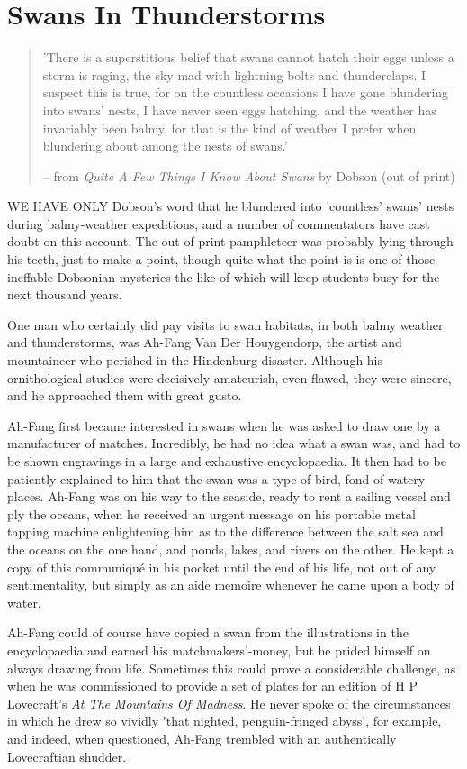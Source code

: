 \chapter{Swans In Thunderstorms}

\begin{quotation}
'There is a superstitious belief that swans cannot hatch their eggs unless a storm is raging, the sky mad with lightning bolts and thunderclaps. I suspect this is true, for on the countless occasions I have gone blundering into swans' nests, I have never seen eggs hatching, and the weather has invariably been balmy, for that is the kind of weather I prefer when blundering about among the nests of swans.' 

-- from \emph{Quite A Few Things I Know About Swans} by Dobson (out of print)
\end{quotation}

WE HAVE ONLY Dobson's word that he blundered into 'countless' swans' nests during balmy-weather expeditions, and a number of commentators have cast doubt on this account. The out of print pamphleteer was probably lying through his teeth, just to make a point, though quite what the point is is one of those ineffable Dobsonian mysteries the like of which will keep students busy for the next thousand years.

One man who certainly did pay visits to swan habitats, in both balmy weather and thunderstorms, was Ah-Fang Van Der Houygendorp, the artist and mountaineer who perished in the Hindenburg disaster. Although his ornithological studies were decisively amateurish, even flawed, they were sincere, and he approached them with great gusto.

Ah-Fang first became interested in swans when he was asked to draw one by a manufacturer of matches. Incredibly, he had no idea what a swan was, and had to be shown engravings in a large and exhaustive encyclopaedia. It then had to be patiently explained to him that the swan was a type of bird, fond of watery places. Ah-Fang was on his way to the seaside, ready to rent a sailing vessel and ply the oceans, when he received an urgent message on his portable metal tapping machine enlightening him as to the difference between the salt sea and the oceans on the one hand, and ponds, lakes, and rivers on the other. He kept a copy of this communiqu\'{e} in his pocket until the end of his life, not out of any sentimentality, but simply as an aide memoire whenever he came upon a body of water.

Ah-Fang could of course have copied a swan from the illustrations in the encyclopaedia and earned his matchmakers'-money, but he prided himself on always drawing from life. Sometimes this could prove a considerable challenge, as when he was commissioned to provide a set of plates for an edition of H P Lovecraft's \emph{At The Mountains Of Madness}. He never spoke of the circumstances in which he drew so vividly 'that nighted, penguin-fringed abyss', for example, and indeed, when questioned, Ah-Fang trembled with an authentically Lovecraftian shudder.

